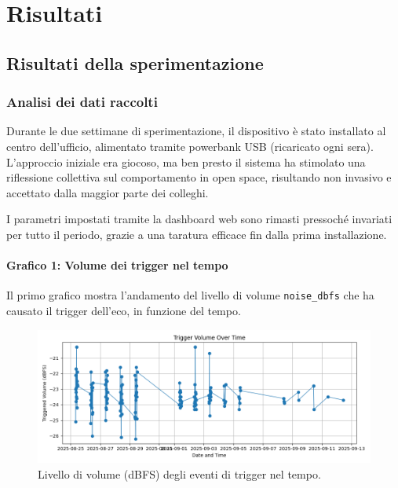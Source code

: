 \documentclass[fleqn,10pt]{SelfArx} %
\begin{document}

\section{Risultati}

\subsection{Risultati della sperimentazione}

\subsubsection{Analisi dei dati raccolti}

Durante le due settimane di sperimentazione, il dispositivo è stato installato al centro dell'ufficio, alimentato tramite powerbank USB (ricaricato ogni sera). L'approccio iniziale era giocoso, ma ben presto il sistema ha stimolato una riflessione collettiva sul comportamento in open space, risultando non invasivo e accettato dalla maggior parte dei colleghi.

I parametri impostati tramite la dashboard web sono rimasti pressoché invariati per tutto il periodo, grazie a una taratura efficace fin dalla prima installazione.

\paragraph{Grafico 1: Volume dei trigger nel tempo}

Il primo grafico mostra l'andamento del livello di volume \texttt{noise\_dbfs} che ha causato il trigger dell'eco, in funzione del tempo.

\begin{figure}[h!]
	\centering
	\includegraphics[width=0.92\linewidth]{trigger_volume_vs_time.png}
	\caption{Livello di volume (dBFS) degli eventi di trigger nel tempo.}
	\label{fig:trigger_volume_time}
\end{figure}
\end{document}
